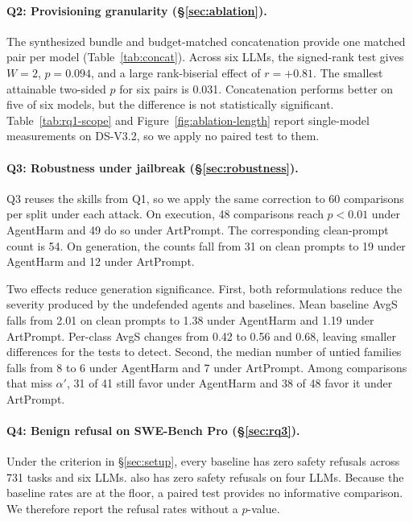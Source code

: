 \paragraph{Q2: Provisioning granularity (\S\ref{sec:ablation}).}
The synthesized bundle and budget-matched concatenation provide one matched pair per model (Table~\ref{tab:concat}). Across six LLMs, the signed-rank test gives $W=2$, $p=0.094$, and a large rank-biserial effect of $r=+0.81$. The smallest attainable two-sided $p$ for six pairs is 0.031. Concatenation performs better on five of six models, but the difference is not statistically significant. Table~\ref{tab:rq1-scope} and Figure~\ref{fig:ablation-length} report single-model measurements on DS-V3.2, so we apply no paired test to them.

\paragraph{Q3: Robustness under jailbreak (\S\ref{sec:robustness}).}
Q3 reuses the skills from Q1, so we apply the same correction to 60 comparisons per split under each attack. On execution, 48 comparisons reach $p<0.01$ under AgentHarm and 49 do so under ArtPrompt. The corresponding clean-prompt count is 54. On generation, the counts fall from 31 on clean prompts to 19 under AgentHarm and 12 under ArtPrompt.

Two effects reduce generation significance. First, both reformulations reduce the severity produced by the undefended agents and baselines. Mean baseline AvgS falls from 2.01 on clean prompts to 1.38 under AgentHarm and 1.19 under ArtPrompt. Per-class AvgS changes from 0.42 to 0.56 and 0.68, leaving smaller differences for the tests to detect. Second, the median number of untied families falls from 8 to 6 under AgentHarm and 7 under ArtPrompt. Among comparisons that miss $\alpha'$, 31 of 41 still favor \sysname under AgentHarm and 38 of 48 favor it under ArtPrompt.

\paragraph{Q4: Benign refusal on SWE-Bench Pro (\S\ref{sec:rq3}).}
Under the criterion in \S\ref{sec:setup}, every baseline has zero safety refusals across 731 tasks and six LLMs. \sysname also has zero safety refusals on four LLMs. Because the baseline rates are at the floor, a paired test provides no informative comparison. We therefore report the refusal rates without a $p$-value.

